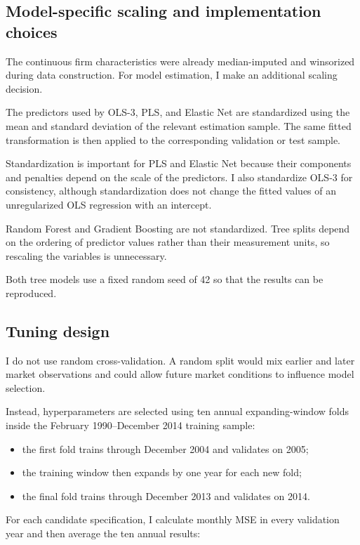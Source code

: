 \documentclass[11pt,a4paper]{article}
\begin{document}
\subsection{Model-specific scaling and implementation choices}

The continuous firm characteristics were already median-imputed and winsorized
during data construction. For model estimation, I make an additional scaling
decision.

The predictors used by OLS-3, PLS, and Elastic Net are standardized using the
mean and standard deviation of the relevant estimation sample. The same fitted
transformation is then applied to the corresponding validation or test sample.

Standardization is important for PLS and Elastic Net because their components
and penalties depend on the scale of the predictors. I also standardize OLS-3
for consistency, although standardization does not change the fitted values of
an unregularized OLS regression with an intercept.

Random Forest and Gradient Boosting are not standardized. Tree splits depend on
the ordering of predictor values rather than their measurement units, so
rescaling the variables is unnecessary.

Both tree models use a fixed random seed of 42 so that the results can be
reproduced.

\subsection{Tuning design}

I do not use random cross-validation. A random split would mix earlier and
later market observations and could allow future market conditions to influence
model selection.

Instead, hyperparameters are selected using ten annual expanding-window folds
inside the February 1990--December 2014 training sample:

\begin{itemize}
  \item the first fold trains through December 2004 and validates on 2005;
  \item the training window then expands by one year for each new fold;
  \item the final fold trains through December 2013 and validates on 2014.
\end{itemize}

For each candidate specification, I calculate monthly MSE in every validation
year and then average the ten annual results:
\end{document}

